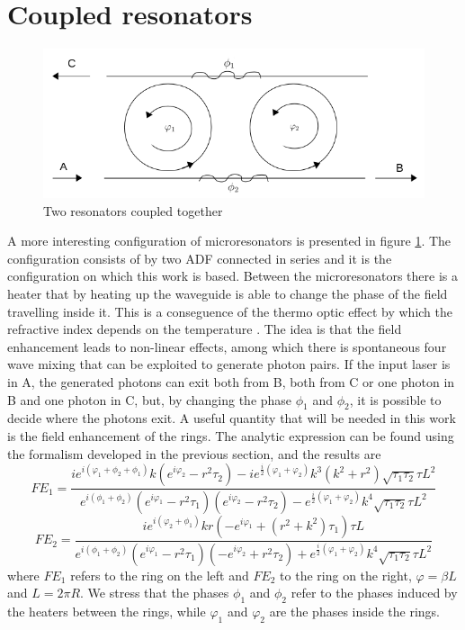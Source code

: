 \section{Coupled resonators}\label{coupled}
\begin{figure}[H]
\centering
\includegraphics[width = .7\textwidth]{img/coupled}
\caption{Two resonators coupled together}
\label{resonatorcoupled}
\end{figure}
A more interesting configuration of microresonators is presented in figure \ref{resonatorcoupled}. The configuration consists of by two ADF connected in series and it is the configuration on which this work is based. Between the microresonators there is a heater that by heating up the waveguide is able to change the phase of the field travelling inside it. This is a conseguence of the thermo optic effect by which the refractive index depends on the temperature \cite{thesis:borghi}. The idea is that the field enhancement leads to non-linear effects, among which there is spontaneous four wave mixing that can be exploited to generate photon pairs. If the input laser is in A, the generated photons can exit both from B, both from C or one photon in B and one photon in C, but, by changing the phase $\phi_1$ and $\phi_2$, it is possible to decide where the photons exit. A useful quantity that will be needed in this work is the field enhancement of the rings. The analytic expression can be found using the formalism developed in the previous section, and the results are
\[FE_1 = \frac{ie^{i(\varphi_1+\phi_2+\phi_1)}k (e^{i\varphi_2}-r^2\tau_2)-ie^{\frac{i}{2}(\varphi_1+\varphi_2)}k^3(k^2+r^2)\sqrt{\tau_1\tau_2}\tau L^2}{e^{i(\phi_1+\phi_2)}(e^{i\varphi_1}-r^2\tau_1)(e^{i\varphi_2}-r^2\tau_2)-e^{\frac{i}{2}(\varphi_1+\varphi_2)}k^4\sqrt{\tau_1\tau_2}\tau L^2}\]
\[FE_2 = \frac{ie^{i(\varphi_2+\phi_1)}kr (-e^{i\varphi_1}+(r^2+k^2)\tau_1)\tau L}{e^{i(\phi_1+\phi_2)}(e^{i\varphi_1}-r^2\tau_1)(-e^{i\varphi_2}+r^2\tau_2)+e^{\frac{i}{2}(\varphi_1+\varphi_2)}k^4\sqrt{\tau_1\tau_2}\tau L^2}\]
where $FE_1$ refers to the ring on the left and $FE_2$ to the ring on the right, $\varphi = \beta L$ and $L=2\pi R$. We stress that the phases $\phi_1$ and $\phi_2$ refer to the phases induced by the heaters between the rings, while $\varphi_1$ and $\varphi_2$ are the phases inside the rings.\\
